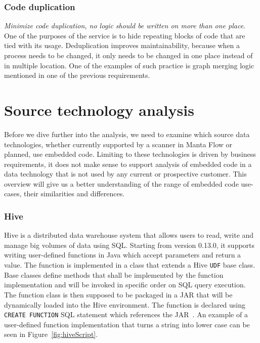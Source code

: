 \subsubsection{Code duplication}

\textit{Minimize code duplication, no logic should be written on more than one place}. One of the purposes of the service is to hide repeating blocks of code that are tied with its usage. Deduplication improves maintainability, because when a process needs to be changed, it only needs to be changed in one place instead of in multiple location. One of the examples of such practice is graph merging logic mentioned in one of the previous requirements.

\section{Source technology analysis}
\label{sec:sourceTechnologyAnalysis}

Before we dive further into the analysis, we need to examine which source data technologies, whether currently supported by a scanner in Manta Flow or planned, use embedded code. Limiting to these technologies is driven by business requirements, it does not make sense to support analysis of embedded code in a data technology that is not used by any current or prospective customer. This overview will give us a better understanding of the range of embedded code use-cases, their similarities and differences.

\subsubsection{Hive}
Hive is a distributed data warehouse system that allows users to read, write and manage big volumes of data using SQL. Starting from version 0.13.0, it supports writing user-defined functions in Java which accept parameters and return a value. The function is implemented in a class that extends a Hive \texttt{UDF} base class. Base classes define methods that shall be implemented by the function implementation and will be invoked in specific order on SQL query execution. The function class is then supposed to be packaged in a JAR that will be dynamically loaded into the Hive environment. The function is declared using \texttt{CREATE FUNCTION} SQL statement which references the JAR~\cite{hive}. An example of a user-defined function implementation that turns a string into lower case can be seen in Figure~\ref{fig:hiveScript}.

